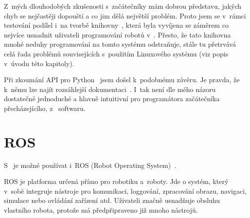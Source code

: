 Z~mých dlouhodobých zkušenosti s~začátečníky mám dobrou představu, jakých chyb se nejčastěji dopouští a co jim dělá největší problém.
Proto jsem se v~rámci testování \evThreeDev{} podílel i~na tvorbě knihovny~\cite{legoMindstormsEV3_ev3dev_RB-ev3dev-cpp-lib}, která byla vyvíjena se záměrem co nejvíce usnadnit uživateli programování robotů v~\evThreeDev{}. 
Přesto, že tato knihovna mnohé neduhy programování na tomto systému odstraňuje, stále tu přetrvává celá řada problémů souvisejících s~použitím Linuxového systému (viz popis v~úvodu této kapitoly).
% 
% 
%
%
%
%
%
%
%
%

Při zkoumání API pro Python~\cite{legoMindstormsEV3_ev3dev-lang-python} jsem došel k~podobnému závěru. 
Je pravda, že k~němu lze najít rozsáhlejší dokumentaci~\cite{legoMindstormsEV3_ev3dev-lang-python-docs}. 
I~tak není dle mého názoru dostatečně jednoduché a hlavně intuitivní pro programátora začátečníka přecházejícího, z~\lego{} softwaru.


\section{ROS}


S~\legoEV{} je možné používat i~ROS (Robot Operating System)~\cite{legoProgramingPlatform_ROS}. 

ROS je platforma určená přímo pro robotiku a~roboty. 
Jde o systém, který v~sobě integruje nástroje pro komunikaci, loggování, zpracování obrazu, navigaci, simulace nebo ovládání zařízení atd.
Uživateli značně usnadňuje obsluhu vlastního robota, protože má předpřipraveno již mnoho nástrojů.

